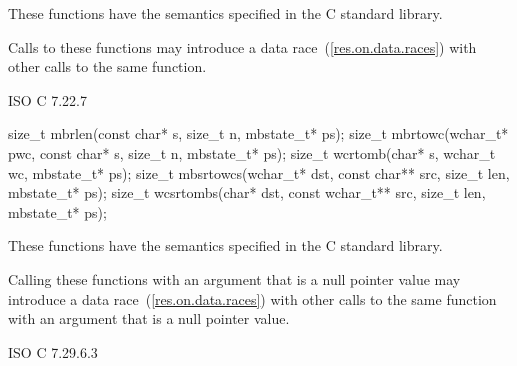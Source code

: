 \begin{itemdescr}
\pnum
\effects
These functions have the semantics specified in the C standard library.

\pnum
\remarks
Calls to these functions
may introduce a data race~(\ref{res.on.data.races})
with other calls to the same function.
\end{itemdescr}

\xref ISO C 7.22.7

%
%
%
%
%
\begin{itemdecl}
size_t mbrlen(const char* s, size_t n, mbstate_t* ps);
size_t mbrtowc(wchar_t* pwc, const char* s, size_t n, mbstate_t* ps);
size_t wcrtomb(char* s, wchar_t wc, mbstate_t* ps);
size_t mbsrtowcs(wchar_t* dst, const char** src, size_t len, mbstate_t* ps);
size_t wcsrtombs(char* dst, const wchar_t** src, size_t len, mbstate_t* ps);
\end{itemdecl}

\begin{itemdescr}
\pnum
\effects
These functions have the semantics specified in the C standard library.

\pnum
\remarks
Calling these functions
with an  argument that is a null pointer value
may introduce a data race~(\ref{res.on.data.races})
with other calls to the same function
with an  argument that is a null pointer value.
\end{itemdescr}

\xref ISO C 7.29.6.3
